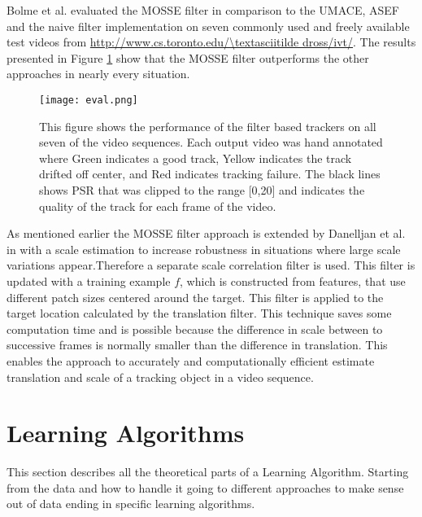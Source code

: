 Bolme et al. evaluated the MOSSE filter in comparison to the UMACE, ASEF and the naive filter implementation on seven commonly used and freely available test videos from \url{http://www.cs.toronto.edu/\textasciitilde dross/ivt/}.
The results presented in Figure \ref{fig:eval} show that the MOSSE filter outperforms the other approaches in nearly every situation. %

\begin{figure}
\centering
  \texttt{[image: eval.png]}
  \caption{This figure shows the performance of the filter based
trackers on all seven of the video sequences. Each output video
was hand annotated where Green indicates a good track, Yellow
indicates the track drifted off center, and Red indicates tracking
failure. The black lines shows PSR that was clipped to the range
[0,20] and indicates the quality of the track for each frame of the
video. \cite{BolmVisu2010}}
  \label{fig:eval}
\end{figure}

As mentioned earlier the MOSSE filter approach is extended by Danelljan et al. in \cite{Danelljan2014} with a scale estimation to increase robustness in situations where large scale variations appear.Therefore a separate scale correlation filter is used.
This filter is updated with a training example $f$, which is constructed from features, that use different patch sizes centered around the target.
This filter is applied to the target location calculated by the translation filter.
This technique saves some computation time and is possible because the difference in scale between to successive frames is normally smaller than the difference in translation. This enables the approach to accurately and computationally efficient estimate translation and scale of a tracking object in a video sequence.




\section{Learning Algorithms}\label{sec:learningAlgorithms}
This section describes all the theoretical parts of a Learning Algorithm. Starting from the data and how to handle it going to different approaches to make sense out of data ending in specific learning algorithms.
